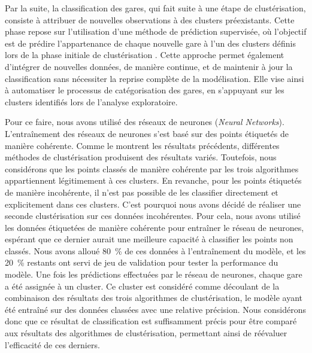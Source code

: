 \begin{refsegment}
Par la suite, la classification des gares, qui fait suite à une étape de clustérisation, consiste à attribuer de nouvelles observations à des clusters préexistants. Cette phase repose sur l'utilisation d'une méthode de prédiction supervisée, où l'objectif est de prédire l'appartenance de chaque nouvelle gare à l'un des clusters définis lors de la phase initiale de clustérisation \textcolor{blue}{\autocite[134-135]{james_introduction_2013}}. Cette approche permet également d'intégrer de nouvelles données, de manière continue, et de maintenir à jour la classification sans nécessiter la reprise complète de la modélisation. Elle vise ainsi à automatiser le processus de catégorisation des gares, en s'appuyant sur les clusters identifiés lors de l'analyse exploratoire.


Pour ce faire, nous avons utilisé des réseaux de neurones (\textsl{Neural Networks}). L’entraînement des réseaux de neurones s’est basé sur des points étiquetés de manière cohérente. Comme le montrent les résultats précédents, différentes méthodes de clustérisation produisent des résultats variés. Toutefois, nous considérons que les points classés de manière cohérente par les trois algorithmes appartiennent légitimement à ces clusters. En revanche, pour les points étiquetés de manière incohérente, il n’est pas possible de les classifier directement et explicitement dans ces clusters. C’est pourquoi nous avons décidé de réaliser une seconde clustérisation sur ces données incohérentes. Pour cela, nous avons utilisé les données étiquetées de manière cohérente pour entraîner le réseau de neurones, espérant que ce dernier aurait une meilleure capacité à classifier les points non classés. Nous avons alloué 80~\% de ces données à l’entraînement du modèle, et les 20~\% restants ont servi de jeu de validation pour tester la performance du modèle. Une fois les prédictions effectuées par le réseau de neurones, chaque gare a été assignée à un cluster. Ce cluster est considéré comme découlant de la combinaison des résultats des trois algorithmes de clustérisation, le modèle ayant été entraîné sur des données classées avec une relative précision. Nous considérons donc que ce résultat de classification est suffisamment précis pour être comparé aux résultats des algorithmes de clustérisation, permettant ainsi de réévaluer l’efficacité de ces derniers.%


\end{refsegment}
